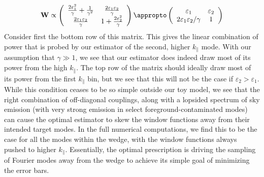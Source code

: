 \documentclass[twocolumn,aps,prd,nofootinbib,showpacs]{revtex4-1}
\begin{document}
\begin{equation}
\mathbf{W} \propto \left( \begin{array}{cc}
\frac{2 \varepsilon_1^2}{\gamma} + \frac{1}{\gamma^2} & \frac{2 \varepsilon_1 \varepsilon_2}{\gamma} \\
\frac{2 \varepsilon_1 \varepsilon_2 }{ \gamma} & 1 + \frac{2 \varepsilon_2^2}{\gamma}
\end{array}
\right)
\appropto
\left( \begin{array}{cc}
\varepsilon_1 & \varepsilon_2 \\
2 \varepsilon_1 \varepsilon_2 / \gamma & 1
\end{array}
\right)
\end{equation}
Consider first the bottom row of this matrix.  This gives the linear combination of power that is probed by our estimator of the second, higher $k_\parallel$ mode.  With our assumption that $\gamma \gg 1$, we see that our estimator does indeed draw most of its power from the high $k_\parallel$.  The top row of the matrix should ideally draw most of its power from the first $k_\parallel$ bin, but we see that this will not be the case if $\varepsilon_2 > \varepsilon_1$.  While this condition ceases to be so simple outside our toy model, we see that the right combination of off-diagonal couplings, along with a lopsided spectrum of sky emission (with very strong emission in select foreground-contaminated modes) can cause the optimal estimator to skew the window functions away from their intended target modes.  In the full numerical computations, we find this to be the case for all the modes within the wedge, with the window functions always pushed to higher $k_\parallel$.  Essentially, the optimal prescription is driving the sampling of Fourier modes away from the wedge to achieve its simple goal of minimizing the error bars.
\end{document}

